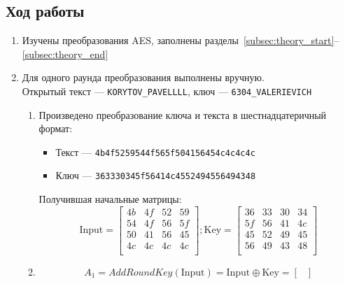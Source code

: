\documentclass[a4paper, 14pt]{extarticle}
\begin{document}
\subsection{Ход работы}
\begin{enumerate}
    \item Изучены преобразования AES, заполнены разделы~\ref{subsec:theory_start}--\ref{subsec:theory_end}
    \item Для одного раунда преобразования выполнены вручную.\\
    Открытый текст --- \texttt{KORYTOV\_PAVELLLL}, ключ --- \texttt{6304\_VALERIEVICH} 
    \begin{enumerate}
        \item Произведено преобразование ключа и текста в шестнадцатеричный формат:
            \begin{itemize}
                \item Текст --- \texttt{4b4f5259544f565f504156454c4c4c4c}
                \item Ключ --- \texttt{363330345f56414c4552494556494348}\\
            \end{itemize}
            Получившая начальные матрицы:
            \begin{equation}
                \text{Input} = \begin{bmatrix}
                    4b  & 4f  & 52  & 59  \\
                    54  & 4f  & 56  & 5f  \\
                    50  & 41  & 56  & 45  \\
                    4c  & 4c  & 4c  & 4c  \\
                    \end{bmatrix}; \text{Key} = \begin{bmatrix}
                    36  & 33  & 30  & 34  \\
                    5f  & 56  & 41  & 4c  \\
                    45  & 52  & 49  & 45  \\
                    56  & 49  & 43  & 48  \\
                \end{bmatrix}
            \end{equation}
        \item \begin{equation}
                A_1 = AddRoundKey(\text{Input}) = \text{Input} \oplus \text{Key} = \begin{bmatrix}

\end{bmatrix}
\end{equation}
\end{enumerate}
\end{enumerate}
\end{document}
